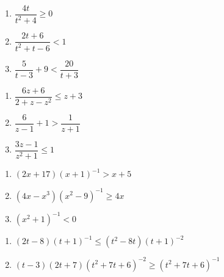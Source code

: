 \begin{multicols}{3}
\begin{enumerate}
\setcounter{enumi}{\value{HW}}


\item  $\dfrac{4t}{t^2+4} \geq 0$
\item  $\dfrac{2t+6}{t^2+t-6} < 1$
\item  $\dfrac{5}{t-3} + 9 < \dfrac{20}{t+3}$

\setcounter{HW}{\value{enumi}}
\end{enumerate}
\end{multicols}

\begin{multicols}{3}
\begin{enumerate}
\setcounter{enumi}{\value{HW}}


\item  $\dfrac{6z+6}{2+z-z^2} \leq z+3$
\item $\dfrac{6}{z-1} + 1 > \dfrac{1}{z+1}$
\item $\dfrac{3z - 1}{z^{2} + 1} \leq 1$

\setcounter{HW}{\value{enumi}}
\end{enumerate}
\end{multicols}

\begin{multicols}{3}
\begin{enumerate}
\setcounter{enumi}{\value{HW}}

\item $(2x+17)(x+1)^{-1} > x + 5$
\item $(4x-x^3)(x^{2} - 9)^{-1} \geq 4x$
\item $(x^{2} + 1)^{-1} < 0$ 

\setcounter{HW}{\value{enumi}}
\end{enumerate}
\end{multicols}

\begin{multicols}{2}
\begin{enumerate}
\setcounter{enumi}{\value{HW}}

\item $(2t-8)(t+1)^{-1} \leq (t^2-8t)(t+1)^{-2}$ %
\item $(t-3)(2t+7)(t^2+7t+6)^{-2} \geq (t^2+7t+6)^{-1}$ %

\setcounter{HW}{\value{enumi}}
\end{enumerate}
\end{multicols}

